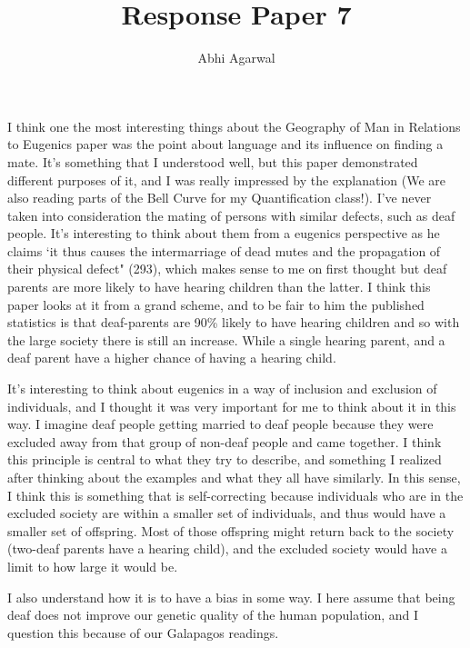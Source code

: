 \documentclass[11pt, oneside]{article}
\title{Response Paper 7}
\author{Abhi Agarwal}
\date{}
\begin{document}
\maketitle

\par I think one the most interesting things about the Geography of Man in Relations to Eugenics paper was the point about language and its influence on finding a mate. It's something that I understood well, but this paper demonstrated different purposes of it, and I was really impressed by the explanation (We are also reading parts of the Bell Curve for my Quantification class!). I've never taken into consideration the mating of persons with similar defects, such as deaf people. It's interesting to think about them from a eugenics perspective as he claims `it thus causes the intermarriage of dead mutes and the propagation of their physical defect" (293), which makes sense to me on first thought but deaf parents are more likely to have hearing children than the latter. I think this paper looks at it from a grand scheme, and to be fair to him the published statistics is that deaf-parents are 90\% likely to have hearing children and so with the large society there is still an increase. While a single hearing parent, and a deaf parent have a higher chance of having a hearing child. 

\par It's interesting to think about eugenics in a way of inclusion and exclusion of individuals, and I thought it was very important for me to think about it in this way. I imagine deaf people getting married to deaf people because they were excluded away from that group of non-deaf people and came together. I think this principle is central to what they try to describe, and something I realized after thinking about the examples and what they all have similarly. In this sense, I think this is something that is self-correcting because individuals who are in the excluded society are within a smaller set of individuals, and thus would have a smaller set of offspring. Most of those offspring might return back to the society (two-deaf parents have a hearing child), and the excluded society would have a limit to how large it would be.

\par I also understand how it is to have a bias in some way. I here assume that being deaf does not improve our genetic quality of the human population, and I question this because of our Galapagos readings.
\end{document}
